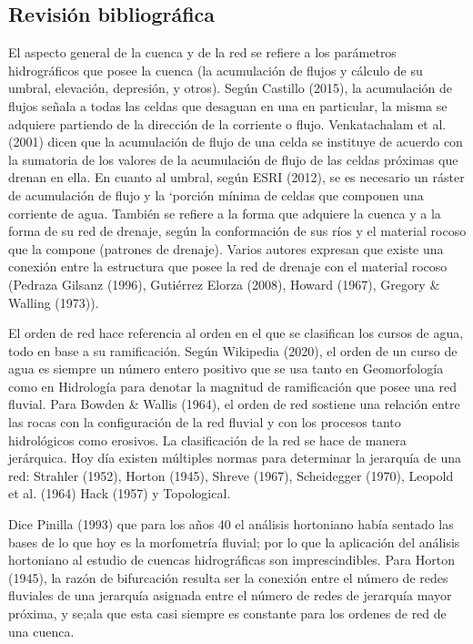 \documentclass[11pt,]{article}
\begin{document}
\subsection{Revisión bibliográfica}\label{revisiuxf3n-bibliogruxe1fica}

El aspecto general de la cuenca y de la red se refiere a los parámetros
hidrográficos que posee la cuenca (la acumulación de flujos y cálculo de
su umbral, elevación, depresión, y otros). Según Castillo (2015), la
acumulación de flujos señala a todas las celdas que desaguan en una en
particular, la misma se adquiere partiendo de la dirección de la
corriente o flujo. Venkatachalam et al. (2001) dicen que la acumulación
de flujo de una celda se instituye de acuerdo con la sumatoria de los
valores de la acumulación de flujo de las celdas próximas que drenan en
ella. En cuanto al umbral, según ESRI (2012), se es necesario un ráster
de acumulación de flujo y la `porción mínima de celdas que componen una
corriente de agua. También se refiere a la forma que adquiere la cuenca
y a la forma de su red de drenaje, según la conformación de sus ríos y
el material rocoso que la compone (patrones de drenaje). Varios autores
expresan que existe una conexión entre la estructura que posee la red de
drenaje con el material rocoso (Pedraza Gilsanz (1996), Gutiérrez Elorza
(2008), Howard (1967), Gregory \& Walling (1973)).

El orden de red hace referencia al orden en el que se clasifican los
cursos de agua, todo en base a su ramificación. Según Wikipedia (2020),
el orden de un curso de agua es siempre un número entero positivo que se
usa tanto en Geomorfología como en Hidrología para denotar la magnitud
de ramificación que posee una red fluvial. Para Bowden \& Wallis (1964),
el orden de red sostiene una relación entre las rocas con la
configuración de la red fluvial y con los procesos tanto hidrológicos
como erosivos. La clasificación de la red se hace de manera jerárquica.
Hoy día existen múltiples normas para determinar la jerarquía de una
red: Strahler (1952), Horton (1945), Shreve (1967), Scheidegger (1970),
Leopold et al. (1964) Hack (1957) y Topological.

Dice Pinilla (1993) que para los años 40 el análisis hortoniano había
sentado las bases de lo que hoy es la morfometría fluvial; por lo que la
aplicación del análisis hortoniano al estudio de cuencas hidrográficas
son imprescindibles. Para Horton (1945), la razón de bifurcación resulta
ser la conexión entre el número de redes fluviales de una jerarquía
asignada entre el número de redes de jerarquía mayor próxima, y se;ala
que esta casi siempre es constante para los ordenes de red de una
cuenca.
\end{document}
